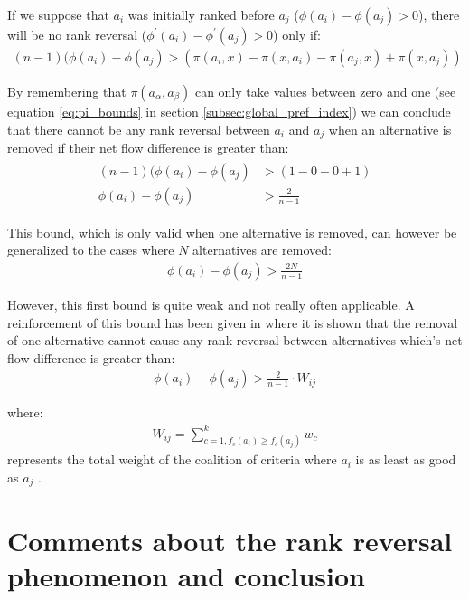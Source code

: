 If we suppose that $a_i$ was initially ranked before $a_j$ ($\phi(a_i) - \phi(a_j)> 0$), there will be no rank reversal ($\phi^{\prime}(a_i) - \phi^{\prime}(a_j)> 0$) only if:
\begin{align}
        (n-1)(\phi(a_i) - \phi(a_j) > (\pi(a_i,x) - \pi(x,a_i) - \pi(a_j,x) + \pi(x, a_j))
    \label{eqn:no_rr_phi_condition_using_x}
\end{align}

By remembering that $\pi(a_{\alpha}, a_{\beta})$ can only take values between zero and one (see equation \ref{eq:pi_bounds} in section \ref{subsec:global_pref_index}) we can conclude that there cannot be any rank reversal between $a_i$ and $a_j$ when an alternative is removed if their net flow difference is greater than:
\begin{align}
    \begin{split}
        (n-1)(\phi(a_i) - \phi(a_j) & > (1 - 0 - 0 + 1) \\
        \phi(a_i) - \phi(a_j) & > \frac{2}{n-1}
    \end{split}
    \label{eqn:no_rr_condition}
\end{align}

This bound, which is only valid when one alternative is removed, can however be generalized to the cases where $N$ alternatives are removed:
\begin{align}
    \phi(a_i) - \phi(a_j) > \frac{2N}{n-1}
    \label{eqn:no_rr_generalization}
\end{align}

However, this first bound is quite weak and not really often applicable.
A reinforcement of this bound has been given in \cite{Verly2013} where it is shown that the removal of one alternative cannot cause any rank reversal between alternatives which's net flow difference is greater than:
\begin{align}
    \phi(a_i) - \phi(a_j) > \frac{2}{n-1}\cdot W_{ij}
    \label{eqn:rr_bound_verly}
\end{align}

where:
\begin{align}
    W_{ij} = \sum\limits_{c=1, f_c(a_i) \ge f_c(a_j)}^k w_c
    \label{eqn:Wij}
\end{align}
represents the total weight of the coalition of criteria where $a_i$ is as least as good as $a_j$ \cite{Verly2013}.

\section{Comments about the rank reversal phenomenon and conclusion}

